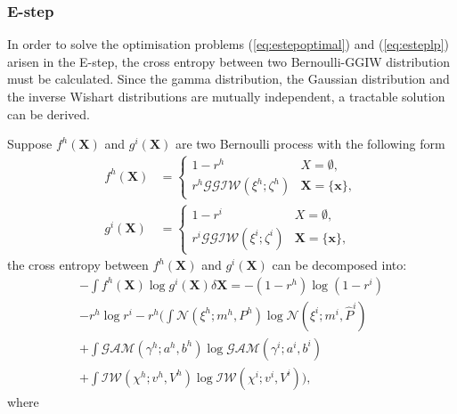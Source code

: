 \documentclass[conference]{IEEEtran}
\begin{document}
\subsubsection{E-step}
In order to solve the optimisation problems (\ref{eq:estepoptimal}) and (\ref{eq:esteplp}) arisen in the E-step, the cross entropy between two Bernoulli-GGIW distribution must be calculated. Since the gamma distribution, the Gaussian distribution and the inverse Wishart distributions are mutually independent, a tractable solution can be derived. 

Suppose $f^h(\mathbf{X})$ and $g^i(\mathbf{X})$ are two Bernoulli process with the following form
\begin{subequations}
\begin{align}
    f^{h}(\mathbf{X}) &= \begin{cases}
        1 - r^{h} & X = \emptyset,\\
        r^{h}\mathcal{GGIW}(\xi^{h};\zeta^{h}) & \mathbf{X} = \{\mathbf{x}\},
    \end{cases}\\
    g^{i}(\mathbf{X}) &= \begin{cases}
        1 - r^{i} & X = \emptyset,\\
        r^{i}\mathcal{GGIW}(\xi^{i};\zeta^{i}) & \mathbf{X} = \{\mathbf{x}\},
    \end{cases}
\end{align}
\end{subequations}
the cross entropy between $f^h(\mathbf{X})$ and $g^i(\mathbf{X})$ can be decomposed into:
\begin{multline}
    -\int f^{h}(\mathbf{X})\log g^{i}(\mathbf{X})\delta \mathbf{X} = -(1-r^{h})\log(1-r^i) \\- r^{h}\log r^i - r^{h}\bigg(\int\mathcal{N}(\xi^{h};m^{h},P^{h})\log\mathcal{N}(\xi^i;m^i,\hat{P}^i) \\+ \int\mathcal{GAM}(\gamma^{h};a^{h},b^{h})\log\mathcal{GAM}(\gamma^i;a^i,b^i) \\+ \int\mathcal{IW}(\chi^{h};v^{h},V^{h})\log\mathcal{IW}(\chi^i;v^i,V^i) \bigg),
\end{multline}
where
\end{document}
